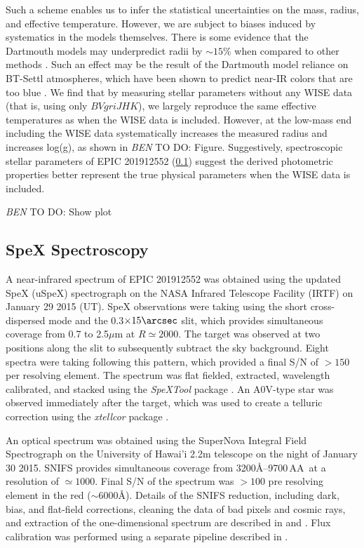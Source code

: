 \documentclass{emulateapj}
\newcommand{\logg}{{log(g)}}
\newcommand{\todo}[3]{{\color{#2} \emph{#1} TO DO: #3}}
\newcommand{\btmtodo}[1]{\todo{BEN}{red}{#1}}
\begin{document}
Such a scheme enables us to infer the statistical uncertainties on the
mass, radius, and effective temperature.
However, we are subject to biases induced by systematics in the models themselves.
There is some evidence that the Dartmouth models may underpredict 
radii by $\sim 15\%$ when compared to other methods \citep{Newton15,
Montet15}. 
Such an effect may be the result of the Dartmouth model reliance on BT-Settl
atmospheres, which have been shown to predict near-IR colors that are too blue
\citep{Thompson14}.
We find that by measuring stellar parameters without any WISE data (that is, using
only $BVgriJHK$), we largely reproduce the same effective temperatures as when
the WISE data is included. 
However, at the low-mass end including the WISE data systematically increases the 
measured radius and increases \logg, as shown in \btmtodo{Figure}.
Suggestively, spectroscopic stellar parameters of EPIC 201912552 
(\textsection\ref{Spexobs}) suggest the derived photometric properties better 
represent the true physical parameters when the WISE data is included. 


\btmtodo{Show plot}



\subsection{SpeX Spectroscopy}
\label{Spexobs}


A near-infrared spectrum of EPIC 201912552 was obtained using the updated SpeX 
(uSpeX) spectrograph \citep{Rayner03} on the NASA Infrared Telescope Facility 
(IRTF) on January 29 2015 (UT). 
SpeX observations were taking using the short cross-dispersed mode and the
0.3$\times15\arcsec$ slit, which provides simultaneous coverage from 0.7 
to 2.5$\mu$m at $R\simeq2000$. 
The target was observed at two positions along the slit to subsequently subtract 
the sky background. Eight spectra were taking following this pattern, which provided 
a final S/N of $>150$ per resolving element. 
The spectrum was flat fielded, extracted, wavelength calibrated, and stacked 
using the \textit{SpeXTool} package \citep{Cushing04}. 
An A0V-type star was observed immediately after 
the target, which was used to create a telluric correction using the 
\textit{xtellcor} package \citep{Vacca03}.

An optical spectrum was obtained using the SuperNova Integral Field Spectrograph
\citep[SNIFS,][]{Aldering02,Lantz04} on the University of Hawai'i 
2.2m telescope on the night of January 30 2015. 
SNIFS provides simultaneous coverage from 3200\AA--9700\,AA\ at a resolution 
of $\simeq1000$. Final S/N of the spectrum was $>100$ pre resolving element 
in the red ($\sim6000$\AA). 
Details of the SNIFS reduction, including dark, bias, and flat-field corrections,
cleaning the data of bad pixels and cosmic rays, and extraction of the 
one-dimensional spectrum are described in \citet{Bacon01} and 
\citet{Aldering06}. 
Flux calibration was performed using a separate pipeline described in \citet{Mann15}. 
\end{document}
